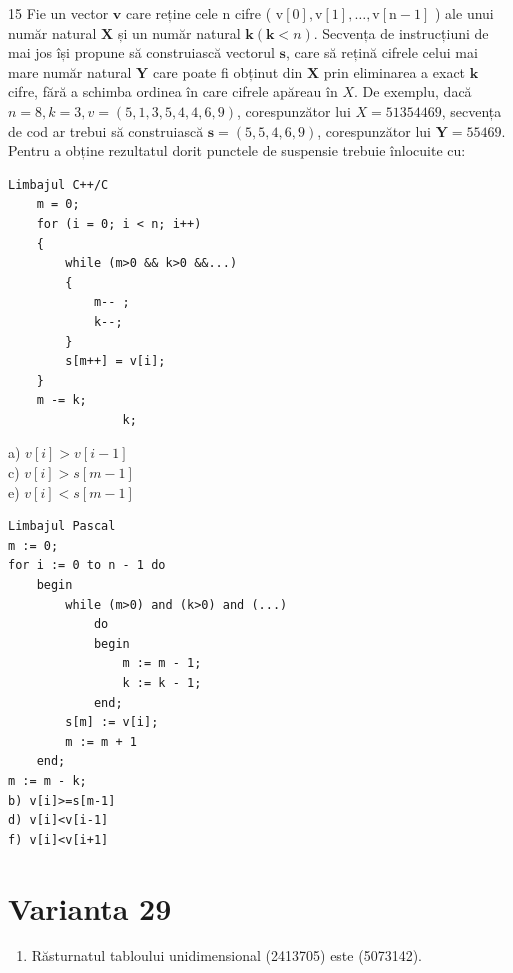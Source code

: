 \documentclass[10pt]{article}
\begin{document}
15 Fie un vector $\mathbf{v}$ care reține cele n cifre ( $\mathrm{v}[0], \mathrm{v}[1], \ldots, \mathrm{v}[\mathrm{n}-1]$ ) ale unui număr natural $\mathbf{X}$ și un număr natural $\mathbf{k}(\mathbf{k}<n)$. Secvența de instrucțiuni de mai jos își propune să construiască vectorul $\mathbf{s}$, care să rețină cifrele celui mai mare număr natural $\mathbf{Y}$ care poate fi obținut din $\mathbf{X}$ prin eliminarea a exact $\mathbf{k}$ cifre, fără a schimba ordinea în care cifrele apăreau în $X$. De exemplu, dacă $n=8, k=3, v=(5,1,3,5,4,4,6,9)$, corespunzător lui $X=51354469$, secvența de cod ar trebui să construiască $\mathbf{s}=(5,5,4,6,9)$, corespunzător lui $\mathbf{Y}=55469$. Pentru a obține rezultatul dorit punctele de suspensie trebuie înlocuite cu:

\begin{verbatim}
Limbajul C++/C
    m = 0;
    for (i = 0; i < n; i++)
    {
        while (m>0 && k>0 &&...)
        {
            m-- ;
            k--;
        }
        s[m++] = v[i];
    }
    m -= k;
                k;
\end{verbatim}

a) $v[i]>v[i-1]$\\
c) $v[i]>s[m-1]$\\
e) $v[i]<s[m-1]$

\begin{verbatim}
Limbajul Pascal
m := 0;
for i := 0 to n - 1 do
    begin
        while (m>0) and (k>0) and (...)
            do
            begin
                m := m - 1;
                k := k - 1;
            end;
        s[m] := v[i];
        m := m + 1
    end;
m := m - k;
b) v[i]>=s[m-1]
d) v[i]<v[i-1]
f) v[i]<v[i+1]
\end{verbatim}

\section*{Varianta 29}
\begin{enumerate}
  \item Răsturnatul tabloului unidimensional (2413705) este (5073142).
\end{enumerate}
\end{document}
